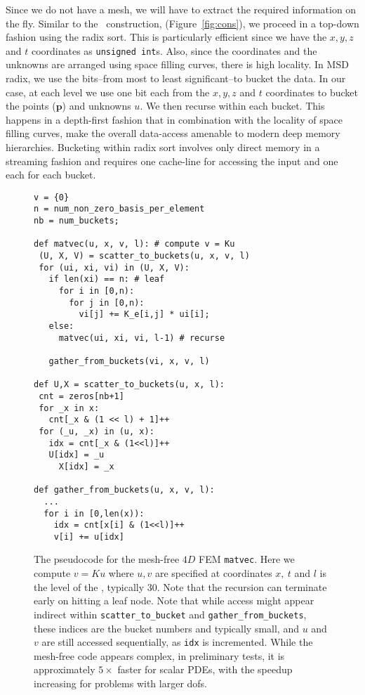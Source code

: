 Since we do not have a mesh, we will have to extract the required information on the fly. Similar to the \stri\ construction, (Figure~\ref{fig:cons}), we proceed in a top-down fashion using the radix sort. This is particularly efficient since we have the $x,y,z$ and $t$ coordinates as \texttt{unsigned int}s. Also, since the coordinates and the unknowns are arranged using space filling curves, there is high locality. In MSD radix, we use the bits--from most to least significant--to bucket the data. In our case, at each level we use one bit each from the $x,y,z$ and $t$ coordinates to bucket the points ($\mathbf{p}$) and unknowns $u$. We then recurse within each bucket. This happens in a depth-first fashion that in combination with the locality of space filling curves, make the overall data-access amenable to modern deep memory hierarchies. Bucketing within radix sort involves only direct memory in a streaming fashion and requires one cache-line for accessing the input and one each for each bucket. 

\begin{figure}

	 \begin{verbatim}
v = {0} 
n = num_non_zero_basis_per_element		
nb = num_buckets;

def matvec(u, x, v, l): # compute v = Ku 
 (U, X, V) = scatter_to_buckets(u, x, v, l)
 for (ui, xi, vi) in (U, X, V):
   if len(xi) == n: # leaf
     for i in [0,n):
       for j in [0,n):
         vi[j] += K_e[i,j] * ui[i];
   else:
     matvec(ui, xi, vi, l-1) # recurse

   gather_from_buckets(vi, x, v, l) 

def U,X = scatter_to_buckets(u, x, l):
 cnt = zeros[nb+1] 
 for _x in x: 
   cnt[_x & (1 << l) + 1]++  
 for (_u, _x) in (u, x):  
   idx = cnt[_x & (1<<l)]++
   U[idx] = _u  
	 X[idx] = _x

def gather_from_buckets(u, x, v, l):
  ... 
  for i in [0,len(x)):  
    idx = cnt[x[i] & (1<<l)]++
    v[i] += u[idx]    
		\end{verbatim}	
	\caption{\label{fig:matvec} \small The pseudocode for the mesh-free $4D$ FEM \texttt{matvec}. Here we compute $v = Ku$ where $u,v$ are specified at coordinates $x,~t$ and $l$ is the level of the \stri, typically $30$. Note that the recursion can terminate early on hitting a leaf node. 
	Note that while access might appear indirect within \texttt{scatter\_to\_bucket} and \texttt{gather\_from\_buckets}, these indices are the bucket numbers and typically small, and $u$ and $v$ are still accessed sequentially, as \texttt{idx} is incremented. 
	While the mesh-free code appears complex, in preliminary tests, %
	it is approximately $5\times$ faster for scalar PDEs, with the speedup
	increasing for problems with larger dofs.
	}
\end{figure}

